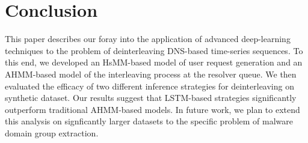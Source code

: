 \section{Conclusion}

This paper describes our foray into the application of advanced 
deep-learning techniques to the problem of deinterleaving DNS-based
time-series sequences.  To this end, we developed an HsMM-based model
of user request generation and an AHMM-based model of the interleaving
process at the resolver queue.  We then evaluated the efficacy of two
different inference strategies for deinterleaving on synthetic
dataset.  Our results suggest that LSTM-based strategies significantly
outperform traditional AHMM-based models.  In future work, we plan to
extend this analysis on signficantly larger datasets to the specific
problem of malware domain group extraction.

